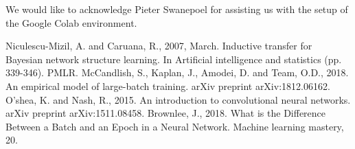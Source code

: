\documentclass[conference]{IEEEtran}
\begin{document}
We would like to acknowledge Pieter Swanepoel for assisting us with the setup of the Google Colab environment.






\begin{thebibliography}{00}
 Niculescu-Mizil, A. and Caruana, R., 2007, March. Inductive transfer for Bayesian network structure learning. In Artificial intelligence and statistics (pp. 339-346). PMLR.
 McCandlish, S., Kaplan, J., Amodei, D. and Team, O.D., 2018. An empirical model of large-batch training. arXiv preprint arXiv:1812.06162.
 O'shea, K. and Nash, R., 2015. An introduction to convolutional neural networks. arXiv preprint arXiv:1511.08458.
 Brownlee, J., 2018. What is the Difference Between a Batch and an Epoch in a Neural Network. Machine learning mastery, 20.

\end{thebibliography}
\end{document}
